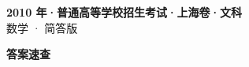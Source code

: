 \documentclass[zihao=-4, a4paper]{ctexart}
\begin{document}
\begin{center}
  {\Large\bfseries 2010 年·普通高等学校招生考试·上海卷·文科}\\[4pt]
  {\large 数学 · 简答版}
\end{center}
\medskip
{}

\clearpage
{}
\begin{center}{\Large\bfseries 答案速查}\end{center}
\medskip

\end{document}
